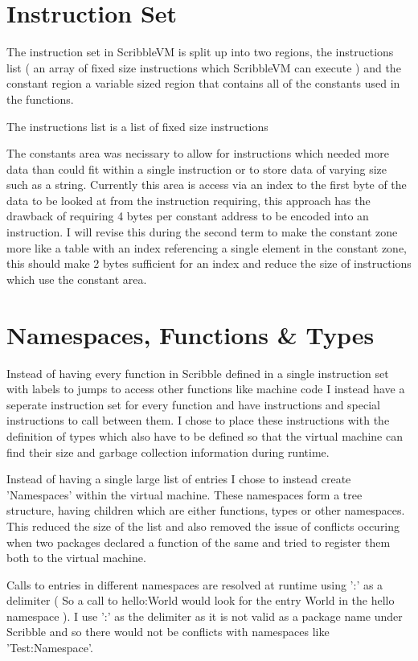 \documentclass[]{final_report}
\begin{document}
\section{Instruction Set}

The instruction set in ScribbleVM is split up into two regions, the instructions list ( an array of fixed size
instructions which ScribbleVM can execute ) and the constant region a variable sized region that contains all
of the constants used in the functions.

The instructions list is a list of fixed size instructions 

The constants area was necissary to allow for instructions which needed more data than could fit within a single instruction or to store data of varying size such as a string. Currently this area is access via an index to the first byte of the data to be looked at from the instruction requiring, this approach has the drawback of requiring 4 bytes per constant address to be encoded into an instruction. I will revise this during the second term to make the constant zone more like a table with an index referencing a single element in the constant zone, this should make 2 bytes sufficient for an index and reduce the size of instructions which use the constant area.

\section{Namespaces, Functions \& Types}

Instead of having every function in Scribble defined in a single instruction set with labels to jumps to access other functions like machine code I instead have a seperate instruction set for every function and have instructions and special instructions to call between them. I chose to place these instructions with the definition of types which also have to be defined so that the virtual machine can find their size and garbage collection information during runtime.

Instead of having a single large list of entries I chose to instead create 'Namespaces' within the virtual machine. These namespaces form a tree structure, having children which are either functions, types or other namespaces. This reduced the size of the list and also removed the issue of conflicts occuring when two packages declared a function of the same and tried to register them both to the virtual machine.

Calls to entries in different namespaces are resolved at runtime using ':' as a delimiter ( So a call to
hello:World would look for the entry World in the hello namespace ). I use ':' as the delimiter as it is not valid as a package name under Scribble and so there would not be conflicts with namespaces like 'Test:Namespace'.
\end{document}
